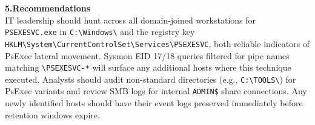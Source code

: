 \documentclass[10pt]{article}
\begin{document}
\begin{singlespace}
\medskip
\textbf{\textcolor{headercol}{5.\enspace Recommendations}}\\
IT leadership should hunt across all domain-joined workstations for \texttt{PSEXESVC.exe} in \texttt{C:\textbackslash Windows\textbackslash}
and the registry key \texttt{HKLM\textbackslash System\textbackslash CurrentControlSet\textbackslash Services\textbackslash PSEXESVC}, both reliable indicators of PsExec lateral movement.
Sysmon EID 17/18 queries filtered for pipe names matching \texttt{\textbackslash PSEXESVC-*} will surface any additional hosts where this technique executed.
Analysts should audit non-standard directories (e.g., \texttt{C:\textbackslash TOOLS\textbackslash}) for PsExec variants and review SMB logs for internal \texttt{ADMIN\$} share connections.
Any newly identified hosts should have their event logs preserved immediately before retention windows expire.

\end{singlespace}
\newpage
\end{document}
